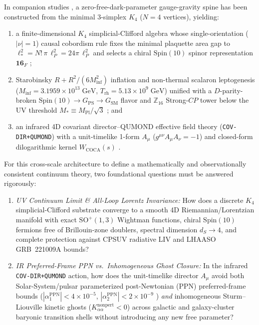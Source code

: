 \documentclass[11pt,a4paper]{article}
\begin{document}
In companion studies \cite{Olcsak2026Zenodo,Olcsak2026JMP,Olcsak2026CovDir,Olcsak2026Paper23,Olcsak2026Paper24,Olcsak2026Paper25,Olcsak2026Paper26}, a zero-free-dark-parameter gauge-gravity spine has been constructed from the minimal 3-simplex $K_4$ ($N = 4$ vertices), yielding:
\begin{enumerate}[label=(\alph*),leftmargin=2.0em,itemsep=2pt]
\item a finite-dimensional $K_4$ simplicial-Clifford algebra whose single-orientation ($|\nu|=1$) causal cobordism rule fixes the minimal plaquette area gap to $\ell_*^2 = N!\,\pi\,\ell_P^2 = 24\pi\,\ell_P^2$ and selects a chiral $\mathrm{Spin}(10)$ spinor representation $\mathbf{16}_F$ \cite{Olcsak2026JMP};
\item Starobinsky $R + R^2/(6 M_{\mathrm{inf}}^2)$ inflation and non-thermal scalaron leptogenesis ($M_{\mathrm{inf}} = 3.1959\times 10^{13}\;\mathrm{GeV}$, $T_{\mathrm{rh}} = 5.13\times 10^9\;\mathrm{GeV}$) unified with a $D$-parity-broken $\mathrm{Spin}(10) \to G_{\mathrm{PS}} \to G_{\mathrm{SM}}$ flavor and $\mathbb{Z}_{16}$ Strong-$CP$ tower below the UV threshold $M_* \equiv M_{\mathrm{Pl}}/\sqrt{3}$ \cite{Olcsak2026Paper24,Olcsak2026Paper25,Olcsak2026Paper26}; and
\item an infrared 4D covariant director--QUMOND effective field theory (\texttt{COV-DIR+QUMOND}) with a unit-timelike 1-form $A_\mu$ ($g^{\mu\nu}A_\mu A_\nu = -1$) and closed-form dilogarithmic kernel $W_{\mathrm{COCA}}(s)$ \cite{Olcsak2026CovDir,Olcsak2026Paper23}.
\end{enumerate}

For this cross-scale architecture to define a mathematically and observationally consistent continuum theory, two foundational questions must be answered rigorously:
\begin{enumerate}[label=\textbf{(Q\arabic*)},leftmargin=2.4em,itemsep=2pt]
\item \emph{UV Continuum Limit \& All-Loop Lorentz Invariance:} How does a discrete $K_4$ simplicial-Clifford substrate converge to a smooth 4D Riemannian/Lorentzian manifold with exact $\mathrm{SO}^+(1,3)$ Wightman functions, chiral $\mathrm{Spin}(10)$ fermions free of Brillouin-zone doublers, spectral dimension $d_S \to 4$, and complete protection against CPSUV radiative LIV and LHAASO GRB~221009A bounds?
\item \emph{IR Preferred-Frame PPN vs.\ Inhomogeneous Ghost Closure:} In the infrared \texttt{COV-DIR+QUMOND} action, how does the unit-timelike director $A_\mu$ avoid both Solar-System/pulsar parameterized post-Newtonian (PPN) preferred-frame bounds ($|\alpha_1^{\mathrm{PPN}}| < 4\times 10^{-5}$, $|\alpha_2^{\mathrm{PPN}}| < 2\times 10^{-9}$ \cite{Will2014,FosterJacobson2006,OostMukohyamaWang2018}) \emph{and} inhomogeneous Sturm--Liouville kinetic ghosts ($K_{\alpha\alpha}^{\mathrm{nonpert}} < 0$) across galactic and galaxy-cluster baryonic transition shells without introducing any new free parameter?
\end{enumerate}
\end{document}
